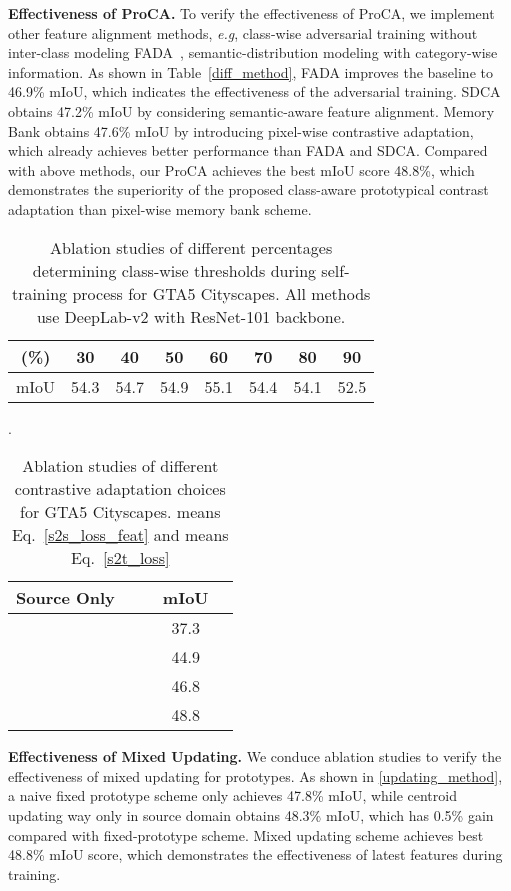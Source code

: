 \documentclass[runningheads]{llncs}
\newcommand{\cmark}{\ding{51}}\newcommand{\xmark}{\ding{55}}\newcommand{\myparagraph}[1]{\medbreak\noindent\textbf{#1}}
\begin{document}
\noindent \textbf{Effectiveness of ProCA.} To verify the effectiveness of ProCA, we implement other feature alignment methods, {\em e.g}, class-wise adversarial training without inter-class modeling FADA~\cite{wang2020classes}, semantic-distribution modeling with category-wise information. As shown in Table~\ref{diff_method}, FADA improves the baseline to 46.9\% mIoU, which indicates the effectiveness of the adversarial training. SDCA~\cite{li2021semantic} obtains 47.2\% mIoU by considering semantic-aware feature alignment. Memory Bank obtains 47.6\% mIoU by introducing pixel-wise contrastive adaptation, which already achieves better performance than FADA and SDCA. Compared with above methods, our ProCA achieves the best mIoU score 48.8\%, which demonstrates the superiority of the proposed class-aware prototypical contrast adaptation than pixel-wise memory bank scheme.

\begin{table}[t]
\caption{Ablation studies of different percentages determining class-wise thresholds during self-training process for GTA5  Cityscapes. All methods use DeepLab-v2 with ResNet-101 backbone.}
    \centering
    \begin{tabular}{c|ccccccc}
    \toprule
           (\%) & 30 & 40 & 50 & 60 & 70 & 80 & 90  \\
         \hline
         mIoU & 54.3 & 54.7 & 54.9 & 55.1 & 54.4 & 54.1 & 52.5 \\
         \bottomrule
    \end{tabular}
\label{diff_percentage}
\end{table}

\begin{table}[t]
\caption{Ablation studies of different contrastive adaptation choices for GTA5  Cityscapes.  means Eq.~\ref{s2s_loss_feat} and  means Eq.~\ref{s2t_loss}}.
    \centering
    \begin{tabular}{ccccc}
    \toprule
         Source Only &  &  & mIoU  \\
         \hline
         \cmark & &  &  37.3 \\
         \cmark & \cmark & & 44.9 \\
         \cmark &  & \cmark & 46.8 \\
         \cmark & \cmark & \cmark & 48.8 \\
         \bottomrule
    \end{tabular}
\label{different_choice}
\end{table}

\noindent \textbf{Effectiveness of Mixed Updating.} We conduce ablation studies to verify the effectiveness of mixed updating for prototypes. As shown in \ref{updating_method}, a naive fixed prototype scheme only achieves 47.8\% mIoU, while centroid updating way only in source domain obtains 48.3\% mIoU, which has 0.5\% gain compared with fixed-prototype scheme. Mixed updating scheme achieves best 48.8\% mIoU score, which demonstrates the effectiveness of latest features during training. 
\end{document}
